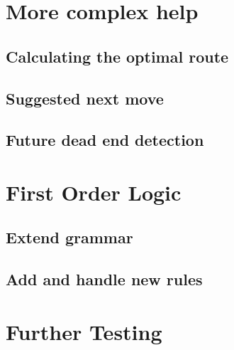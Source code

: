 \documentclass{report}
\begin{document}
\section{More complex help}
\subsection{Calculating the optimal route}
\subsection{Suggested next move}
\subsection{Future dead end detection}

\section{First Order Logic}
\subsection{Extend grammar}
\subsection{Add and handle new rules}

\section{Further Testing}
\end{document}
